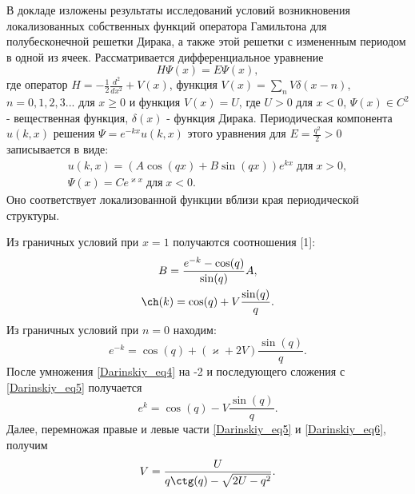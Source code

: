 \documentclass{vzmsthesis}
\begin{document}
\vzmscaption

В докладе изложены результаты исследований условий возникновения локализованных собственных функций оператора Гамильтона
для полубесконечной решетки Дирака, а также этой решетки с измененным периодом в одной из ячеек. Рассматривается дифференциальное уравнение 
\begin{equation} \label{Darinskiy_eq1}
 H\Psi(x)=E\Psi(x),
\end{equation}
где оператор $H=-\frac{1}{2}\frac{d^2}{dx^2}+V(x)$, функция $V(x)=\sum\limits_nV\delta(x-n)$, $n=0,1,2,3...$ для $x\geq0$ и 
функция $V(x)=U$, где $U>0$ для $x<0$, $\Psi(x)\in C^2$ - вещественная функция,
$\delta(x)$ - функция Дирака. Периодическая компонента $u(k,x)$ решения $\Psi=e^{-kx}u(k,x)$ этого уравнения  для $E=\frac{q^2}{2}>0$ записывается в виде:
\begin{equation} \label{Darinskiy_eq2}
\begin{array}{c}
u(k,x)=(A\cos(qx)+B\sin(qx))e^{kx}\;\text{для}\;x>0,\\
\Psi(x)=Ce^{\varkappa x}\;\text{для}\;x<0.
\end{array}
\end{equation} 
Оно соответствует локализованной функции вблизи края периодической структуры.
\par Из граничных условий при $x=1$ получаются соотношения [1]:
\begin{gather}
B=\frac{e^{-k}-\cos(q)}{\sin(q)}A,\\
\ch(k)=\cos(q)+V\frac{\sin(q)}{q}. \label{Darinskiy_eq4}
\end{gather}
Из граничных условий при $n=0$ находим:
\begin{equation}\label{Darinskiy_eq5}
e^{-k}=\cos(q)+\left(\varkappa+2V\right)\frac{\sin(q)}{q}.
\end{equation}
После умножения \eqref{Darinskiy_eq4} на -2 и последующего сложения с \eqref{Darinskiy_eq5} получается 
\begin{equation} \label{Darinskiy_eq6}
 e^{k}=\cos(q)-V\frac{\sin(q)}{q}.
\end{equation}
Далее, перемножая правые и левые части \eqref{Darinskiy_eq5} и \eqref{Darinskiy_eq6}, получим
\begin{equation} \label{Darinskiy_eq7}
V=\frac{U}{q\ctg(q)-\sqrt{2U-q^2}}.
\end{equation}
\end{document}
